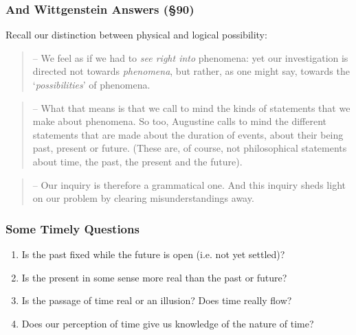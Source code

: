 \begin{frame}
\frametitle{And Wittgenstein Answers (\S 90)}

Recall our distinction between physical and logical possibility:

\pause

\begin{quote}
-- We feel as if we had to \textit{see right into} phenomena: yet our investigation is directed not towards \textit{phenomena}, but rather, as one might say, towards the `\textit{possibilities}' of phenomena.
\end{quote}
\pause 
\begin{quote}
-- What that means is that we call to mind the kinds of statements that we make about phenomena. So too, Augustine calls to mind the different statements that are made about the duration of events, about their being past, present or future. (These are, of course, not philosophical statements about time, the past, the present and the future).
\end{quote}



\pause 

\begin{quote}
-- Our inquiry is therefore a grammatical one. And this inquiry sheds light on our problem by clearing misunderstandings away.
\end{quote}
\end{frame}

\fi 

\begin{frame}
\frametitle{Some Timely Questions}

\begin{enumerate}[<+->]

\item Is the past fixed while the future is open (i.e. not yet settled)?

\item Is the present in some sense more real than the past or future?

\item Is the passage of time real or an illusion? Does time really flow?

\item Does our perception of time give us knowledge of the nature of time?


\end{enumerate}
\end{frame}


